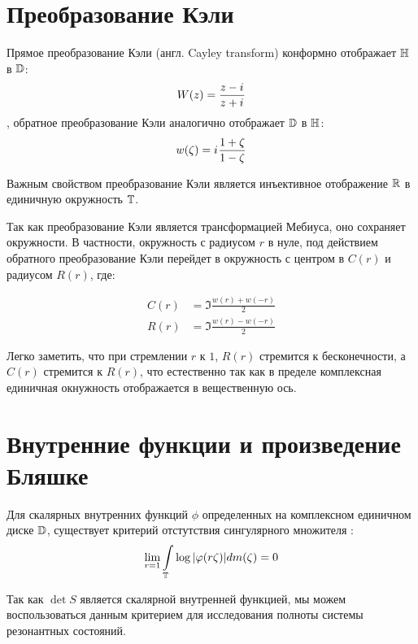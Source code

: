 \section{Преобразование Кэли}

Прямое преобразование Кэли (англ. Cayley transform) конформно отображает $\mathbb{H}$ в $\mathbb{D}$:
\begin{equation}\label{eq:cayley}
W(z) = \frac{z - {i\mkern1mu}}{z + {i\mkern1mu}}
\end{equation}
, обратное преобразование Кэли аналогично отображает $\mathbb{D}$ в $\mathbb{H}$:
\begin{equation}\label{eq:cayley_inverse}
w(\zeta) = {i\mkern1mu} \frac{1 + \zeta}{1 - \zeta}
\end{equation}

Важным свойством преобразование Кэли является инъективное отображение $\mathbb{R}$ в единичную окружность $\mathbb{T}$.

Так как преобразование Кэли является трансформацией Мебиуса, оно сохраняет окружности. В частности, окружность с радиусом $r$ в нуле, под действием обратного преобразование Кэли перейдет в окружность с центром в $C(r)$ и радиусом $R(r)$, где:

\begin{equation}\label{eq:c_and_r}
\begin{aligned}
   C(r) &= \Im \frac{w(r) + w(-r)}{2}
\\ R(r) &= \Im \frac{w(r) - w(-r)}{2}
\end{aligned}
\end{equation}

Легко заметить, что при стремлении $r$ к $1$, $R(r)$ стремится к бесконечности, а $C(r)$ стремится к $R(r)$, что естественно так как в пределе комплексная единичная окнужность отображается в вещественную ось.


\section{Внутренние функции и произведение Бляшке}
Для скалярных внутренних функций $\phi$ определенных на комплексном единичном диске $\mathbb{D}$, существует критерий отстутствия сингулярного множителя \cite[стр. 99]{nikol2012treatise}:
\[
\lim\limits_{r = 1} \int\limits_{\mathbb{T}} \log \abs{\varphi(r \zeta)} d m(\zeta) = 0
\]

Так как $\det S$ является скалярной внутренней функцией, мы можем воспользоваться данным критерием для исследования полноты системы резонантных состояний.

